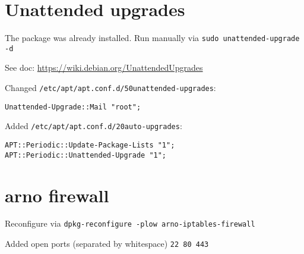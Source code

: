 \documentclass{article}
\begin{document}
\section{Unattended upgrades}

The package was already installed.
Run manually via \verb|sudo unattended-upgrade -d|

See doc: \url{https://wiki.debian.org/UnattendedUpgrades}

Changed \verb|/etc/apt/apt.conf.d/50unattended-upgrades|:
\begin{lstlisting}
Unattended-Upgrade::Mail "root";   
\end{lstlisting}

Added \verb|/etc/apt/apt.conf.d/20auto-upgrades|:
\begin{lstlisting}
APT::Periodic::Update-Package-Lists "1";
APT::Periodic::Unattended-Upgrade "1";
\end{lstlisting}

\section{arno firewall}
Reconfigure via \verb|dpkg-reconfigure -plow arno-iptables-firewall|

Added open ports (separated by whitespace) \verb|22 80 443|
\end{document}
